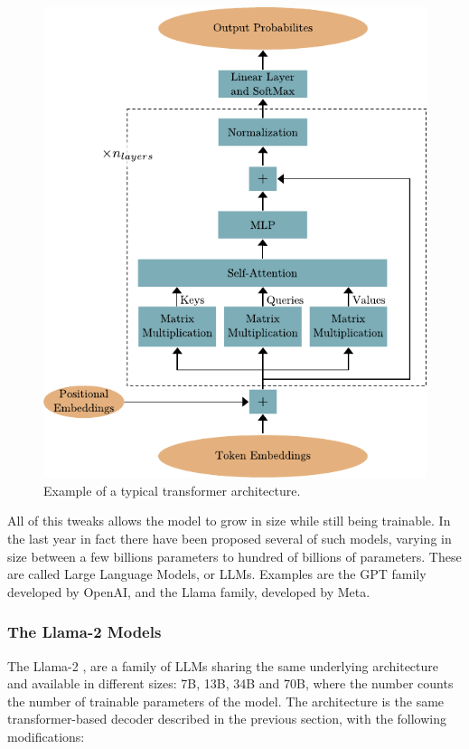 \documentclass[]{marticle}
\begin{document}
\begin{figure}[!tb] 
\begin{center}
\includegraphics{transformer_architecture.pdf}
\caption{Example of a typical transformer architecture.} 
\label{fig:transformer-architecture} 
\end{center}
\end{figure}

All of this tweaks allows the model to grow in size while still being trainable. In the last year in
fact there have been proposed several of such models, varying in size between a few billions
parameters to hundred of billions of parameters. These are called Large Language Models, or LLMs.
Examples are the GPT family developed by OpenAI, and the Llama family, developed by Meta.

\subsubsection{The Llama-2 Models}

The Llama-2 \cite{llama}, \cite{llama-2} are a family of LLMs sharing the same underlying
architecture and available in different sizes: 7B, 13B, 34B and 70B, where the number counts the
number of trainable parameters of the model. The architecture is the same transformer-based decoder
described in the previous section, with the following modifications:
\end{document}

